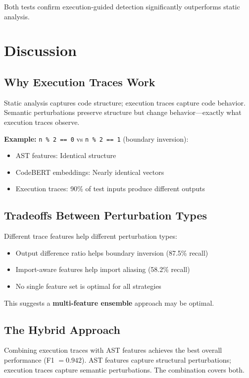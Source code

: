 \documentclass[conference]{IEEEtran}
\begin{document}
Both tests confirm execution-guided detection significantly outperforms static analysis.

\section{Discussion}
\label{sec:discussion}

\subsection{Why Execution Traces Work}

Static analysis captures code structure; execution traces capture code behavior. Semantic perturbations preserve structure but change behavior---exactly what execution traces observe.

\textbf{Example:} \texttt{n \% 2 == 0} vs \texttt{n \% 2 == 1} (boundary inversion):
\begin{itemize}
    \item AST features: Identical structure
    \item CodeBERT embeddings: Nearly identical vectors
    \item Execution traces: 90\% of test inputs produce different outputs
\end{itemize}

\subsection{Tradeoffs Between Perturbation Types}

Different trace features help different perturbation types:
\begin{itemize}
    \item Output difference ratio helps boundary inversion (87.5\% recall)
    \item Import-aware features help import aliasing (58.2\% recall)
    \item No single feature set is optimal for all strategies
\end{itemize}

This suggests a \textbf{multi-feature ensemble} approach may be optimal.

\subsection{The Hybrid Approach}

Combining execution traces with AST features achieves the best overall performance (F1 $= 0.942$). AST features capture structural perturbations; execution traces capture semantic perturbations. The combination covers both.
\end{document}
